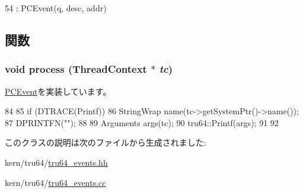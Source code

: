 \begin{DoxyCode}
54         : PCEvent(q, desc, addr) {}
\end{DoxyCode}


\subsection{関数}
\hypertarget{classPrintfEvent_ad66a9d5ec7cfe597b848a17c0df5cc28}{
\subsubsection[{process}]{\setlength{\rightskip}{0pt plus 5cm}void process ({\bf ThreadContext} $\ast$ {\em tc})}}
\label{classPrintfEvent_ad66a9d5ec7cfe597b848a17c0df5cc28}


\hyperlink{classPCEvent_af6ff225900b7b98c08880da7225b38f0}{PCEvent}を実装しています。


\begin{DoxyCode}
84 {
85     if (DTRACE(Printf)) {
86         StringWrap name(tc->getSystemPtr()->name());
87         DPRINTFN("");
88 
89         Arguments args(tc);
90         tru64::Printf(args);
91     }
92 }
\end{DoxyCode}


このクラスの説明は次のファイルから生成されました:\begin{DoxyCompactItemize}
\item 
kern/tru64/\hyperlink{tru64__events_8hh}{tru64\_\-events.hh}\item 
kern/tru64/\hyperlink{tru64__events_8cc}{tru64\_\-events.cc}\end{DoxyCompactItemize}

